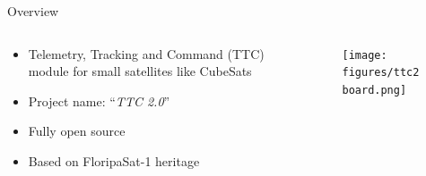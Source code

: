 %
%
%
%
%

%
%
%
%
%

\begin{frame}{Overview}

    \begin{columns}[t]
        \begin{column}[t]{0.5\textwidth}
            \begin{itemize}
                \item Telemetry, Tracking and Command (TTC) module for small satellites like CubeSats
                \vspace{0.5cm}
                \item Project name: ``\textit{TTC 2.0}''
                \vspace{0.5cm}
                \item Fully open source
                \vspace{0.5cm}
                \item Based on FloripaSat-1 heritage
            \end{itemize}
        \end{column}
        \begin{column}[t]{0.5\textwidth}
            \begin{figure}[!ht]
                \begin{center}
                    \texttt{[image: figures/ttc2board.png]}
                \end{center}
            \end{figure}
        \end{column}
    \end{columns}

\end{frame}


